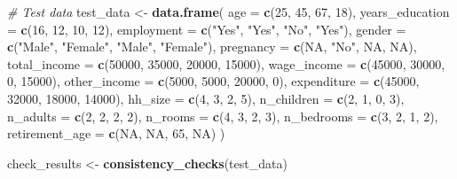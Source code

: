 \documentclass[
]{article}
\newenvironment{Shaded}{\begin{snugshade}}{\end{snugshade}}
\newcommand{\AttributeTok}[1]{\textcolor[rgb]{0.13,0.29,0.53}{#1}}
\newcommand{\CommentTok}[1]{\textcolor[rgb]{0.56,0.35,0.01}{\textit{#1}}}
\newcommand{\ConstantTok}[1]{\textcolor[rgb]{0.56,0.35,0.01}{#1}}
\newcommand{\DecValTok}[1]{\textcolor[rgb]{0.00,0.00,0.81}{#1}}
\newcommand{\FunctionTok}[1]{\textcolor[rgb]{0.13,0.29,0.53}{\textbf{#1}}}
\newcommand{\NormalTok}[1]{#1}
\newcommand{\OtherTok}[1]{\textcolor[rgb]{0.56,0.35,0.01}{#1}}
\newcommand{\StringTok}[1]{\textcolor[rgb]{0.31,0.60,0.02}{#1}}
\begin{document}
\begin{Shaded}
\begin{Highlighting}[]
\CommentTok{\# Test data}
\NormalTok{test\_data }\OtherTok{\textless{}{-}} \FunctionTok{data.frame}\NormalTok{(}
  \AttributeTok{age =} \FunctionTok{c}\NormalTok{(}\DecValTok{25}\NormalTok{, }\DecValTok{45}\NormalTok{, }\DecValTok{67}\NormalTok{, }\DecValTok{18}\NormalTok{),}
  \AttributeTok{years\_education =} \FunctionTok{c}\NormalTok{(}\DecValTok{16}\NormalTok{, }\DecValTok{12}\NormalTok{, }\DecValTok{10}\NormalTok{, }\DecValTok{12}\NormalTok{),}
  \AttributeTok{employment =} \FunctionTok{c}\NormalTok{(}\StringTok{"Yes"}\NormalTok{, }\StringTok{"Yes"}\NormalTok{, }\StringTok{"No"}\NormalTok{, }\StringTok{"Yes"}\NormalTok{),}
  \AttributeTok{gender =} \FunctionTok{c}\NormalTok{(}\StringTok{"Male"}\NormalTok{, }\StringTok{"Female"}\NormalTok{, }\StringTok{"Male"}\NormalTok{, }\StringTok{"Female"}\NormalTok{),}
  \AttributeTok{pregnancy =} \FunctionTok{c}\NormalTok{(}\ConstantTok{NA}\NormalTok{, }\StringTok{"No"}\NormalTok{, }\ConstantTok{NA}\NormalTok{, }\ConstantTok{NA}\NormalTok{),}
  \AttributeTok{total\_income =} \FunctionTok{c}\NormalTok{(}\DecValTok{50000}\NormalTok{, }\DecValTok{35000}\NormalTok{, }\DecValTok{20000}\NormalTok{, }\DecValTok{15000}\NormalTok{),}
  \AttributeTok{wage\_income =} \FunctionTok{c}\NormalTok{(}\DecValTok{45000}\NormalTok{, }\DecValTok{30000}\NormalTok{, }\DecValTok{0}\NormalTok{, }\DecValTok{15000}\NormalTok{),}
  \AttributeTok{other\_income =} \FunctionTok{c}\NormalTok{(}\DecValTok{5000}\NormalTok{, }\DecValTok{5000}\NormalTok{, }\DecValTok{20000}\NormalTok{, }\DecValTok{0}\NormalTok{),}
  \AttributeTok{expenditure =} \FunctionTok{c}\NormalTok{(}\DecValTok{45000}\NormalTok{, }\DecValTok{32000}\NormalTok{, }\DecValTok{18000}\NormalTok{, }\DecValTok{14000}\NormalTok{),}
  \AttributeTok{hh\_size =} \FunctionTok{c}\NormalTok{(}\DecValTok{4}\NormalTok{, }\DecValTok{3}\NormalTok{, }\DecValTok{2}\NormalTok{, }\DecValTok{5}\NormalTok{),}
  \AttributeTok{n\_children =} \FunctionTok{c}\NormalTok{(}\DecValTok{2}\NormalTok{, }\DecValTok{1}\NormalTok{, }\DecValTok{0}\NormalTok{, }\DecValTok{3}\NormalTok{),}
  \AttributeTok{n\_adults =} \FunctionTok{c}\NormalTok{(}\DecValTok{2}\NormalTok{, }\DecValTok{2}\NormalTok{, }\DecValTok{2}\NormalTok{, }\DecValTok{2}\NormalTok{),}
  \AttributeTok{n\_rooms =} \FunctionTok{c}\NormalTok{(}\DecValTok{4}\NormalTok{, }\DecValTok{3}\NormalTok{, }\DecValTok{2}\NormalTok{, }\DecValTok{3}\NormalTok{),}
  \AttributeTok{n\_bedrooms =} \FunctionTok{c}\NormalTok{(}\DecValTok{3}\NormalTok{, }\DecValTok{2}\NormalTok{, }\DecValTok{1}\NormalTok{, }\DecValTok{2}\NormalTok{),}
  \AttributeTok{retirement\_age =} \FunctionTok{c}\NormalTok{(}\ConstantTok{NA}\NormalTok{, }\ConstantTok{NA}\NormalTok{, }\DecValTok{65}\NormalTok{, }\ConstantTok{NA}\NormalTok{)}
\NormalTok{)}

\NormalTok{check\_results }\OtherTok{\textless{}{-}} \FunctionTok{consistency\_checks}\NormalTok{(test\_data)}
\end{Highlighting}
\end{Shaded}
\end{document}
